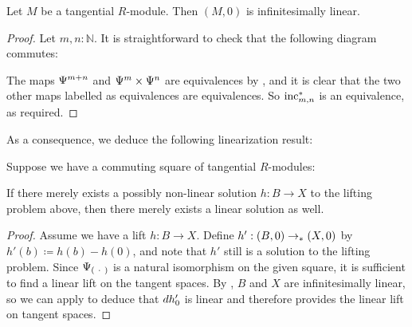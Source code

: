 \begin{corollary}\label{cor:tangential-inf-lin}
  Let $M$ be a tangential $R$-module. Then $(M,0)$ is infinitesimally linear.
\end{corollary}

\begin{proof}
  Let $m, n : \mathbb{N}$.
  It is straightforward to check that the following diagram commutes:
  \begin{center}
  \end{center}
  The maps $\Psi^{m+n}$ and $\Psi^m \times \Psi^n$ are equivalences by , and it is clear that the two other maps labelled as equivalences are equivalences.
  So $\mathrm{inc}_{m,n}^\ast$ is an equivalence, as required.
\end{proof}

As a consequence, we deduce the following linearization result:

\begin{theorem}\label{thm:linearize-lift}
  Suppose we have a commuting square of tangential $R$-modules:
  \begin{center}
  \end{center}
  If there merely exists a possibly non-linear solution $h : B \to X$ to the lifting problem above, then there merely exists a linear solution as well.
\end{theorem}

\begin{proof}
  Assume we have a lift $h : B \to X$.
  Define $h' : (B,0) \to_{\ast} (X,0)$ by $h'(b) \coloneq h(b) - h(0)$,
  and note that $h'$ still is a solution to the lifting problem.
  Since $\Psi_{(\ \cdot\ )}$ is a natural isomorphism on the given square, it is sufficient to find a linear lift on the tangent spaces.
  By , $B$ and $X$ are infinitesimally linear,
  so we can apply  to deduce that $dh'_0$
  is linear and therefore provides the linear lift on tangent spaces.
\end{proof}

